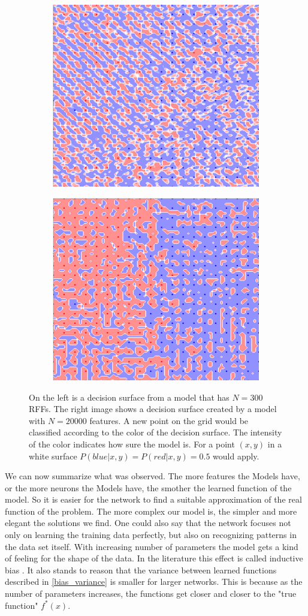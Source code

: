 \newpage

\begin{figure}[!htp]
\centering
\begin{subfigure}{}
  \centering
  \includegraphics[width=.42\linewidth]{Abschlussarbeit_2021/LaTeX/images/Decision_Surface_less_features.png}
  \label{fig:sub1}
\end{subfigure}%
\begin{subfigure}{}
  \centering
  \includegraphics[width=.42\linewidth]{Abschlussarbeit_2021/LaTeX/images/Decision_Surface_many_features.png}
  \label{fig:sub2}
\end{subfigure}
\caption{On the left is a decision surface from a model that has $N = 300$ RFFs. The right image shows a decision surface created by a model with $N = 20000$ features. A new point on the grid would be classified according to the color of the decision surface. The intensity of the color indicates how sure the model is. For a point $(x,y)$ in a white surface $P(blue|x,y) = P(red|x,y) = 0.5$ would apply.}
\label{decision_RFF}
\end{figure}

We can now summarize what was observed. The more features the Models have, or the more neurons the Models have, the smother the learned function of the model. So it is easier for the network to find a suitable approximation of the real function of the problem. The more complex our model is, the simpler and more elegant the solutions we find. One could also say that the network focuses not only on learning the training data perfectly, but also on recognizing patterns in the data set itself. With increasing number of parameters the model gets a kind of feeling for the shape of the data. In the literature this effect is called inductive bias \cite{wikipedia_inductiv_bias}.
It also stands to reason that the variance between learned functions described in \ref{bias_variance} is smaller for larger networks. This is because as the number of parameters increases, the functions get closer and closer to the "true function" $f^*(x)$. 

